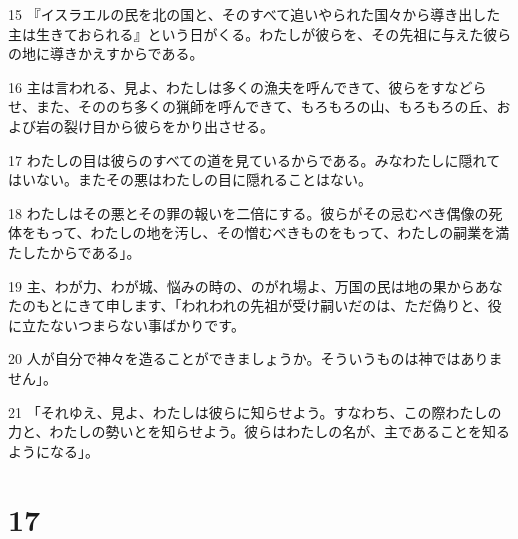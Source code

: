 \par 15 『イスラエルの民を北の国と、そのすべて追いやられた国々から導き出した主は生きておられる』という日がくる。わたしが彼らを、その先祖に与えた彼らの地に導きかえすからである。
\par 16 主は言われる、見よ、わたしは多くの漁夫を呼んできて、彼らをすなどらせ、また、そののち多くの猟師を呼んできて、もろもろの山、もろもろの丘、および岩の裂け目から彼らをかり出させる。
\par 17 わたしの目は彼らのすべての道を見ているからである。みなわたしに隠れてはいない。またその悪はわたしの目に隠れることはない。
\par 18 わたしはその悪とその罪の報いを二倍にする。彼らがその忌むべき偶像の死体をもって、わたしの地を汚し、その憎むべきものをもって、わたしの嗣業を満たしたからである」。
\par 19 主、わが力、わが城、悩みの時の、のがれ場よ、万国の民は地の果からあなたのもとにきて申します、「われわれの先祖が受け嗣いだのは、ただ偽りと、役に立たないつまらない事ばかりです。
\par 20 人が自分で神々を造ることができましょうか。そういうものは神ではありません」。
\par 21 「それゆえ、見よ、わたしは彼らに知らせよう。すなわち、この際わたしの力と、わたしの勢いとを知らせよう。彼らはわたしの名が、主であることを知るようになる」。

\chapter{17}

